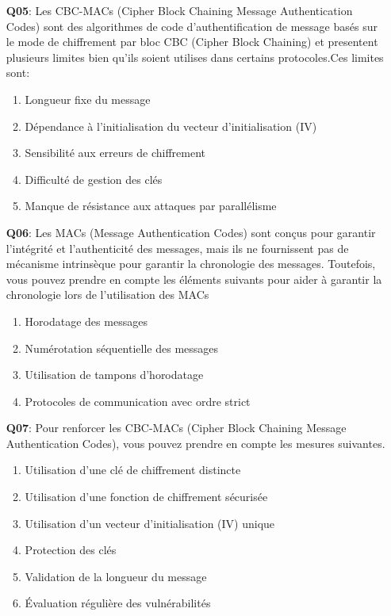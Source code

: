 \begin{enumerate}
    \item [\textbf{Q05}:] Les CBC-MACs (Cipher Block Chaining Message Authentication Codes) sont des algorithmes de code d'authentification de message basés sur le mode de chiffrement par bloc CBC (Cipher Block Chaining) et presentent plusieurs limites bien qu'ils soient utilises dans certains protocoles.Ces limites sont:
    \begin{enumerate}
        \item Longueur fixe du message
        \item Dépendance à l'initialisation du vecteur d'initialisation (IV)
        \item Sensibilité aux erreurs de chiffrement
        \item Difficulté de gestion des clés
        \item Manque de résistance aux attaques par parallélisme
    \end{enumerate}
    
    \item [\textbf{Q06}:] Les MACs (Message Authentication Codes) sont conçus pour garantir l'intégrité et l'authenticité des messages, mais ils ne fournissent pas de mécanisme intrinsèque pour garantir la chronologie des messages. Toutefois, vous pouvez prendre en compte les éléments suivants pour aider à garantir la chronologie lors de l'utilisation des MACs 
    \begin{enumerate}
        \item Horodatage des messages
        \item Numérotation séquentielle des messages
        \item Utilisation de tampons d'horodatage
        \item Protocoles de communication avec ordre strict
    \end{enumerate}
    
    
    \item [\textbf{Q07}:] Pour renforcer les CBC-MACs (Cipher Block Chaining Message Authentication Codes), vous pouvez prendre en compte les mesures suivantes.
    \begin{enumerate}
        \item Utilisation d'une clé de chiffrement distincte
        \item Utilisation d'une fonction de chiffrement sécurisée
        \item Utilisation d'un vecteur d'initialisation (IV) unique
        \item Protection des clés
        \item Validation de la longueur du message
        \item Évaluation régulière des vulnérabilités
    \end{enumerate}
    

\end{enumerate}
